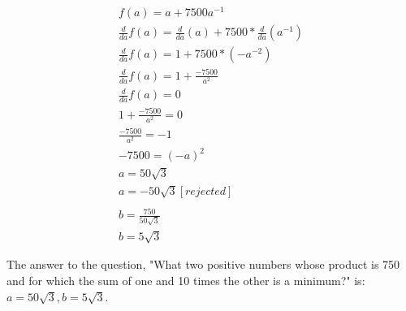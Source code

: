 \documentclass {article}
\begin{document}
\begin{align*}
	f(a)=a + 7500a^{-1}\\
	\frac{d}{da}f(a)=\frac{d}{da}(a) + 7500*\frac{d}{da}(a^{-1})\\
	\frac{d}{da}f(a)=1+7500*(-a^{-2})\\
	\frac{d}{da}f(a)=1+\frac{-7500}{a^2}\\
	\frac{d}{da}f(a)=0\\
	1+\frac{-7500}{a^2}=0\\
	\frac{-7500}{a^2}=-1\\
	-7500=(-a)^2\\
	a=50\sqrt{3}\\
	a=-50\sqrt{3} [rejected]\\
	\\
	b=\frac{750}{50\sqrt{3}}\\
	b=5\sqrt{3}
\end{align*}

The answer to the question, "What two positive numbers whose product is 750 and for which the sum of one and 10 times the other is a minimum?" is: $a=50\sqrt{3}, b=5\sqrt{3}$.
\end{document}
